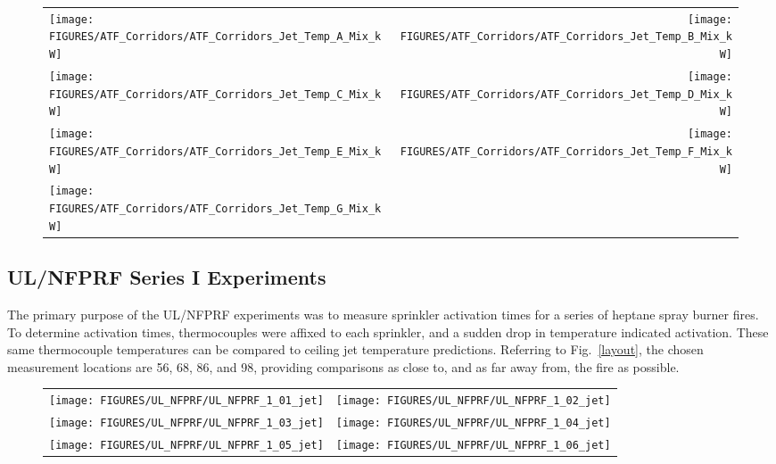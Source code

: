 \begin{figure}[p]
\begin{tabular*}{\textwidth}{l@{\extracolsep{\fill}}r}
\texttt{[image: FIGURES/ATF\_Corridors/ATF\_Corridors\_Jet\_Temp\_A\_Mix\_kW]} &
\texttt{[image: FIGURES/ATF\_Corridors/ATF\_Corridors\_Jet\_Temp\_B\_Mix\_kW]} \\
\texttt{[image: FIGURES/ATF\_Corridors/ATF\_Corridors\_Jet\_Temp\_C\_Mix\_kW]} &
\texttt{[image: FIGURES/ATF\_Corridors/ATF\_Corridors\_Jet\_Temp\_D\_Mix\_kW]} \\
\texttt{[image: FIGURES/ATF\_Corridors/ATF\_Corridors\_Jet\_Temp\_E\_Mix\_kW]} &
\texttt{[image: FIGURES/ATF\_Corridors/ATF\_Corridors\_Jet\_Temp\_F\_Mix\_kW]} \\
\texttt{[image: FIGURES/ATF\_Corridors/ATF\_Corridors\_Jet\_Temp\_G\_Mix\_kW]} &
\end{tabular*}
\label{ATF_Corridors_Jet_Temp_Mix_kW}
\end{figure}


\clearpage

\subsection{UL/NFPRF Series I Experiments}

The primary purpose of the UL/NFPRF experiments was to measure sprinkler activation times for a series of heptane spray burner fires. To determine activation times, thermocouples were affixed to each sprinkler, and a sudden drop in temperature indicated activation. These same thermocouple temperatures can be compared to ceiling jet temperature predictions. Referring to Fig.~\ref{layout}, the chosen measurement locations are 56, 68, 86, and 98, providing comparisons as close to, and as far away from, the fire as possible.


\begin{figure}[h!]
\begin{tabular*}{\textwidth}{l@{\extracolsep{\fill}}r}
\texttt{[image: FIGURES/UL\_NFPRF/UL\_NFPRF\_1\_01\_jet]} &
\texttt{[image: FIGURES/UL\_NFPRF/UL\_NFPRF\_1\_02\_jet]} \\
\texttt{[image: FIGURES/UL\_NFPRF/UL\_NFPRF\_1\_03\_jet]} &
\texttt{[image: FIGURES/UL\_NFPRF/UL\_NFPRF\_1\_04\_jet]} \\
\texttt{[image: FIGURES/UL\_NFPRF/UL\_NFPRF\_1\_05\_jet]} &
\texttt{[image: FIGURES/UL\_NFPRF/UL\_NFPRF\_1\_06\_jet]}
\end{tabular*}
\label{UL_NFPRF_jet_1}
\end{figure}

